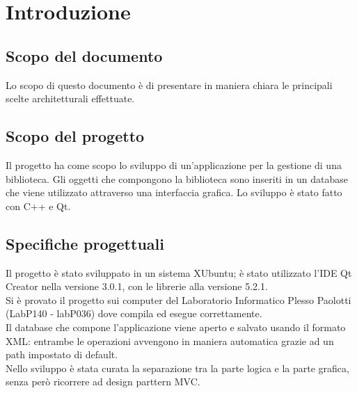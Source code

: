 \section{Introduzione}{
	\subsection{Scopo del documento}{
		Lo scopo di questo documento è di presentare in maniera chiara le principali scelte architetturali effettuate.
	}
	\subsection{Scopo del progetto}{
		Il progetto ha come scopo lo sviluppo di un'applicazione per la gestione di una biblioteca. Gli oggetti che compongono la biblioteca sono inseriti in un database che viene utilizzato attraverso una interfaccia grafica.
		Lo sviluppo è stato fatto con C++ e Qt. 
	}
	\subsection{Specifiche progettuali}{
		Il progetto è stato sviluppato in un sistema XUbuntu; è stato utilizzato l'IDE Qt Creator nella versione 3.0.1, con le librerie alla versione 5.2.1.	\\
		Si è provato il progetto sui computer del Laboratorio Informatico Plesso Paolotti (LabP140 - labP036) dove compila ed esegue correttamente.\\
		Il database che compone l'applicazione viene aperto e salvato usando il formato XML: entrambe le operazioni avvengono in maniera automatica grazie ad un path impostato di default. \\
		Nello sviluppo è stata curata la separazione tra la parte logica e la parte grafica, senza però ricorrere  ad design parttern MVC.
	}
}


